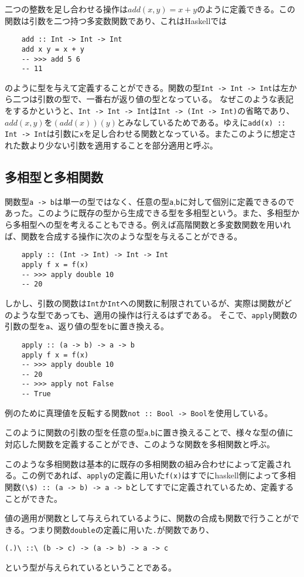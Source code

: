\documentclass[uplatex,dvipdfmx]{jsarticle}
\newcommand{\pr}[1]{\colorbox[rgb]{0.9,0.9,0.9}{\lstinline{#1}}}
\newcommand{\functype}[2]{\pr{#1 -> #2}}
\newcommand{\fpmor}[3]{\pr{#1 :: #2 -> #3}}
\begin{document}
  二つの整数を足し合わせる操作は$add(x,y)=x+y$のように定義できる。この関数は引数を二つ持つ多変数関数であり、これはHaskellでは
  \begin{lstlisting}
    add :: Int -> Int -> Int
    add x y = x + y
    -- >>> add 5 6
    -- 11
  \end{lstlisting}
  のように型を与えて定義することができる。関数の型\pr{Int -> Int -> Int}は左から二つは引数の型で、一番右が返り値の型となっている。
  なぜこのような表記をするかというと、\pr{Int -> Int -> Int}は\pr{Int -> (Int -> Int)}の省略であり、$add(x,y)$を$(add(x))(y)$とみなしているためである。ゆえに\fpmor{add(x)}{Int}{Int}は引数に\pr{x}を足し合わせる関数となっている。またこのように想定された数より少ない引数を適用することを部分適用と呼ぶ。
  \subsection{多相型と多相関数}
  関数型\functype{a}{b}は単一の型ではなく、任意の型\pr{a},\pr{b}に対して個別に定義できるのであった。このように既存の型から生成できる型を多相型という。また、多相型から多相型への型を考えることもできる。例えば高階関数と多変数関数を用いれば、関数を合成する操作に次のような型を与えることができる。
  \begin{lstlisting}
    apply :: (Int -> Int) -> Int -> Int
    apply f x = f(x)
    -- >>> apply double 10
    -- 20
  \end{lstlisting}
  しかし、引数の関数は\pr{Int}か\pr{Int}への関数に制限されているが、実際は関数がどのような型であっても、適用の操作は行えるはずである。
  そこで、\pr{apply}関数の引数の型を\pr{a}、返り値の型を\pr{b}に置き換える。
    \begin{lstlisting}
    apply :: (a -> b) -> a -> b
    apply f x = f(x)
    -- >>> apply double 10
    -- 20
    -- >>> apply not False
    -- True
  \end{lstlisting}
  例のために真理値を反転する関数\fpmor{not}{Bool}{Bool}を使用している。
  
  このように関数の引数の型を任意の型\pr{a},\pr{b}に置き換えることで、様々な型の値に対応した関数を定義することができ、このような関数を多相関数と呼ぶ。

  このような多相関数は基本的に既存の多相関数の組み合わせによって定義される。この例であれば、\pr{apply}の定義に用いた\pr{f(x)}はすでにhaskell側によって多相関数\pr{(\$) :: (a -> b) -> a -> b}としてすでに定義されているため、定義することができた。

  値の適用が関数として与えられているように、関数の合成も関数で行うことができる。つまり関数\pr{double}の定義に用いた\pr{.}が関数であり、
  \begin{center}
    \pr{(.)\ ::\ (b -> c) -> (a -> b) -> a -> c}
  \end{center}
  という型が与えられているということである。
\end{document}
